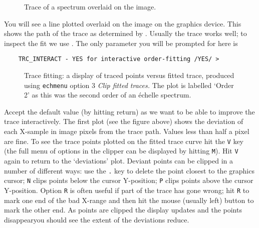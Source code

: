 \begin{htmlonly}
\begin{figure}
\begin{center}
\leavevmode\epsfysize=136mm
\parbox{140mm}{
\caption{Trace of a spectrum overlaid on the image.}
\label{fi_order_trace_again}
}
\end{center}
\end{figure}
\end{htmlonly}

You will see a line plotted overlaid on the image on the graphics device.
This shows the path of the trace as determined by
\@.
Usually the trace works well; to inspect the fit we use
.
The only parameter you will be prompted for here is

{
\scspec{\small}{ }
\begin{verbatim}
    TRC_INTERACT - YES for interactive order-fitting /YES/ >
\end{verbatim}
}

\begin{figure}
\begin{center}
{\leavevmode\epsfysize=136mm}

\parbox{140mm}{
\caption{Trace fitting: a display of traced points versus fitted trace,
produced using {\tt echmenu} option 3 {\sl Clip fitted traces.}
The plot is labelled `Order 2' as this was the second order of an
\'{e}chelle spectrum.}
\label{fi_trace_fit}
}
\end{center}
\end{figure}

Accept the default value (by hitting return) as we want to be able to
improve the trace interactively.
The first plot (see 
{the figure above}) shows the deviation of each X-sample in image
pixels from the trace path.
Values less than half a pixel are fine.  To see the
trace points plotted on the fitted trace curve hit the \verb+V+ key (the
full menu of options in the clipper can be displayed by hitting \verb+M+).
Hit \verb+V+ again to return to the `deviations' plot.  Deviant points can
be clipped in a number of different ways: use the \verb+.+ key to delete
the point closest to the graphics cursor; \verb+N+ clips points below the
cursor Y-position; \verb+P+ clips points above the cursor Y-position.
Option \verb+R+ is often useful if part of the trace has gone wrong;
hit \verb+R+ to mark one end of the bad X-range and then hit the mouse
(usually left) button to mark the other end.
As points are clipped the display updates and the points
disappear\scspec{---}{ - }you should see the extent of the
deviations reduce.

